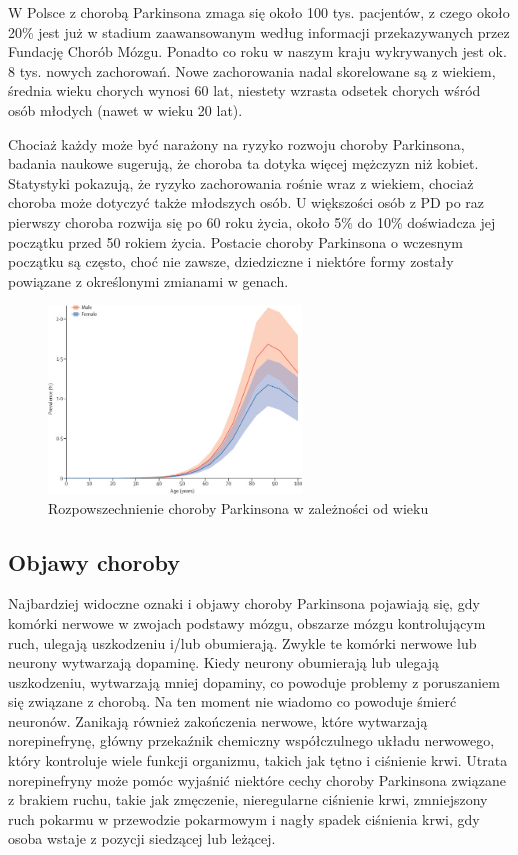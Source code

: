 W Polsce z chorobą Parkinsona zmaga się około 100 tys. pacjentów, z czego około 20\% jest już w stadium zaawansowanym
według informacji przekazywanych przez Fundację Chorób Mózgu.
Ponadto co roku w naszym kraju wykrywanych jest ok. 8 tys. nowych zachorowań.
Nowe zachorowania nadal skorelowane są z wiekiem, średnia wieku chorych wynosi 60 lat, niestety wzrasta odsetek chorych wśród osób młodych (nawet w wieku 20 lat).

Chociaż każdy może być narażony na ryzyko rozwoju choroby Parkinsona, badania naukowe sugerują,
że choroba ta dotyka więcej mężczyzn niż kobiet.
Statystyki pokazują, że ryzyko zachorowania rośnie wraz z wiekiem, chociaż choroba może dotyczyć także młodszych osób.
U większości osób z PD po raz pierwszy choroba rozwija się po 60 roku życia, około 5\% do 10\% doświadcza jej początku przed 50 rokiem życia.
Postacie choroby Parkinsona o wczesnym początku są często, choć nie zawsze, dziedziczne i niektóre formy zostały powiązane z
określonymi zmianami w genach\cite{National_Institute_on_Aging_2022}.

\begin{figure}[htbp]
	\centering
	\includegraphics[width=0.6\textwidth]{./img/PD_prevalence}
	\caption{Rozpowszechnienie choroby Parkinsona w zależności od wieku \cite{global_PD}}
    \label{fig:PD_prevalance}
\end{figure}


\subsection{Objawy choroby}
\label{subsec:objawy}

Najbardziej widoczne oznaki i objawy choroby Parkinsona pojawiają się, gdy komórki nerwowe w zwojach podstawy mózgu,
obszarze mózgu kontrolującym ruch, ulegają uszkodzeniu i/lub obumierają.
Zwykle te komórki nerwowe lub neurony wytwarzają dopaminę.
Kiedy neurony obumierają lub ulegają uszkodzeniu, wytwarzają mniej dopaminy, co powoduje problemy z poruszaniem się
związane z chorobą.
Na ten moment nie wiadomo co powoduje śmierć neuronów.
Zanikają również zakończenia nerwowe, które wytwarzają norepinefrynę, główny przekaźnik chemiczny
współczulnego układu nerwowego, który kontroluje wiele funkcji organizmu, takich jak tętno i ciśnienie krwi.
Utrata norepinefryny może pomóc wyjaśnić niektóre cechy choroby Parkinsona związane z brakiem ruchu, takie jak zmęczenie,
nieregularne ciśnienie krwi, zmniejszony ruch pokarmu w przewodzie pokarmowym i nagły spadek ciśnienia krwi, gdy osoba wstaje z pozycji siedzącej lub leżącej.


